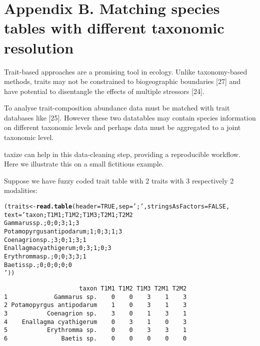 \documentclass[letterpaper,superscriptaddress,showkeys,longbibliography]{revtex4-1}\usepackage[]{graphicx}\usepackage[]{color}
\makeatletter
\newcommand{\hlnum}[1]{\textcolor[rgb]{0.686,0.059,0.569}{#1}}%
\newcommand{\hlstr}[1]{\textcolor[rgb]{0.192,0.494,0.8}{#1}}%
\newcommand{\hlstd}[1]{\textcolor[rgb]{0.345,0.345,0.345}{#1}}%
\newcommand{\hlkwb}[1]{\textcolor[rgb]{0.69,0.353,0.396}{#1}}%
\newcommand{\hlkwc}[1]{\textcolor[rgb]{0.333,0.667,0.333}{#1}}%
\newcommand{\hlkwd}[1]{\textcolor[rgb]{0.737,0.353,0.396}{\textbf{#1}}}%
\newenvironment{kframe}{%
 \def\at@end@of@kframe{}%
 \ifinner\ifhmode%
  \def\at@end@of@kframe{\end{minipage}}%
  \begin{minipage}{\columnwidth}%
 \fi\fi%
 \def\FrameCommand##1{\hskip\@totalleftmargin \hskip-\fboxsep
 \colorbox{shadecolor}{##1}\hskip-\fboxsep
     \hskip-\linewidth \hskip-\@totalleftmargin \hskip\columnwidth}%
 \MakeFramed {\advance\hsize-\width
   \@totalleftmargin\z@ \linewidth\hsize
   \@setminipage}}%
 {\par\unskip\endMakeFramed%
 \at@end@of@kframe}
\newenvironment{knitrout}{}{} %
\makeatother
\begin{document}
\section*{Appendix B. Matching species tables with different taxonomic resolution} 

Trait-based approaches are a promising tool in ecology. Unlike taxonomy-based methods, traits may not be constrained to biogeographic boundaries [27] and have potential to disentangle the effects of multiple stressors [24]. 

To analyse trait-composition abundance data must be matched with trait databases like [25]. However these two datatables may contain species information on different taxonomic levels and perhaps data must be aggregated to a joint taxonomic level.

taxize can help in this data-cleaning step, providing a reproducible workflow. Here we illustrate this on a small fictitious example.

Suppose we have fuzzy coded trait table with 2 traits with 3 respectively 2 modalities:

\begin{knitrout}
\color{fgcolor}\begin{kframe}
\begin{alltt}
\hlstd{(traits} \hlkwb{<-} \hlkwd{read.table}\hlstd{(}\hlkwc{header} \hlstd{=} \hlnum{TRUE}\hlstd{,} \hlkwc{sep} \hlstd{=} \hlstr{';'}\hlstd{,} \hlkwc{stringsAsFactors}\hlstd{=}\hlnum{FALSE}\hlstd{,}
                      \hlkwc{text} \hlstd{=} \hlstr{'taxon;T1M1;T1M2;T1M3;T2M1;T2M2
Gammarus sp.;0;0;3;1;3
Potamopyrgus antipodarum;1;0;3;1;3
Coenagrion sp.;3;0;1;3;1
Enallagma cyathigerum;0;3;1;0;3
Erythromma sp.;0;0;3;3;1
Baetis sp.;0;0;0;0;0
'}\hlstd{))}
\end{alltt}
\begin{verbatim}
                     taxon T1M1 T1M2 T1M3 T2M1 T2M2
1             Gammarus sp.    0    0    3    1    3
2 Potamopyrgus antipodarum    1    0    3    1    3
3           Coenagrion sp.    3    0    1    3    1
4    Enallagma cyathigerum    0    3    1    0    3
5           Erythromma sp.    0    0    3    3    1
6               Baetis sp.    0    0    0    0    0
\end{verbatim}
\end{kframe}
\end{knitrout}
\end{document}
